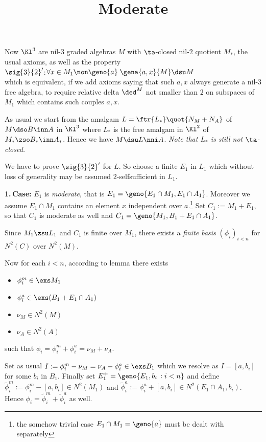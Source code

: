 \documentclass[a4paper,11pt,german,english]{article}
\title{Moderate}
\date{}
\begin{document}
\maketitle
Now $\Kl^{3}$ are nil-$3$ graded algebras $M$ with $\ta$-closed nil-$2$ quotient $M_{*}$,
the usual axioms, as well as the property\\[+1mm]
$\sig{3}{2}^{\prime}$:\quad $\forall x\in M_{1}\non\geno{a}\;\gena{a,x}{M}\dsu M$\\[+2mm]
which is equivalent, if we add axioms saying that such $a,x$ always generate
a nil-$3$ free algebra, to require relative delta $\ded^{M}$ not smaller than $2$ on subspaces of $M_{1}$ which contains such couples $a,x$.

\medskip
As usual we start from the amalgam $L=\ftr{L_{*}}\quot {N_{M}+N_{A}}$ of $M\dso B\inn A$
in $\Kl^{3}$ where $L_{*}$ is the free amalgam in $\Kl^{2}$ of $M_{*}\zso B_{*}\inn A_{*}$.
Hence we have $M\dsu L \nni A$. {\em Note that $L_{*}$ is still not $\ta$-closed.}

\medskip
We have to prove $\sig{3}{2}^{\prime}$ for $L$. So choose a finite $E_{1}$ in $L_{1}$ which
without loss of generality may be assumed $2$-selfsufficient in $L_{1}$.

\smallskip
{\bf 1.{\,}Case:} $E_{1}$ is {\em moderate}, that is $E_{1}=\geno{E_{1}\cap M_{1},E_{1}\cap A_{1}}$. Moreover we assume $E_{1}\cap M_{1}$ contains an element $x$ independent
over $a$.\footnote{the somehow trivial case $E_{1}\cap M_{1}=\geno{a}$ must be dealt with separately}
Set $C_{1}:=M_{1}+E_{1}$, so that $C_{1}$ is moderate as well and $C_{1}=\geno{M_{1},B_{1}+E_{1}\cap A_{1}}$.

Since $M_{1}\zsu L_{1}$ and $C_{1}$ is finite over $M_{1}$, there exists a {\em finite basis}
$(\phi_{i})_{i<n}$ for $N^{2}(C)$ over $N^{2}(M)$.

Now for each $i<n$, according to lemma \pref{} there exists
\begin{itemize}
\item $\phi^{m}_{i}\in\exs M_{1}$
\item $\phi^{a}_{i}\in\exs (B_{1}+E_{1}\cap A_{1})$
\item $\nu_{M}\in N^{2}(M)$
\item $\nu_{A}\in N^{2}(A)$
\end{itemize}
such that $\phi_{i}=\phi^{m}_{i}+\phi^{a}_{i}=\nu_{M}+\nu_{A}$.

Set as usual
$I:=\phi^{m}_{i}-\nu_{M}=\nu_{A}-\phi^{a}_{i}\in\exs B_{1}$ which we resolve
as $I=[a,b_{i}]$ for some $b_{i}$ in $B_{1}$. Finally set $E_{1}^{+}=\geno{E_{1},b_{i}\,:
i<n}$ and define $\tilde\phi ^{m}_{i}:=\phi^{m}_{i}-[a,b_{i}]\in N^{2}(M_{1})$ and
$\tilde\phi ^{a}_{i}:=\phi^{a}_{i}+[a,b_{i}]\in N^{2}(E_{1}\cap A_{1},b_{i})$. Hence $\phi_{i}=\tilde\phi ^{m}_{i}+\tilde\phi ^{a}_{i}$ as well.
\end{document}

